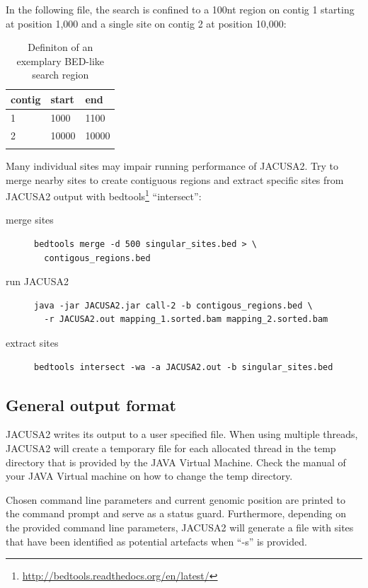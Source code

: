 \documentclass[10pt,a4paper]{article} \usepackage[utf8]{inputenc}
\begin{document}
In the following file, the search is confined to a 100nt region on contig 1
starting at position 1,000 and a single site on contig 2 at position 10,000:
\begin{table}
\centering
  \caption{Definiton of an exemplary BED-like search region}
  \label{tbl:search_region}
  \begin{tabular}{lll}
    \textbf{contig} & \textbf{start} & \textbf{end} \\
    \hline
    1 & 1000 & 1100 \\
    2 & 10000 & 10000 \\
    \multicolumn{3}{c}{}
  \end{tabular}
\end{table}
Many individual sites may impair running performance of JACUSA2.
Try to merge nearby sites to create contiguous regions and extract specific sites from 
JACUSA2 output with bedtools\footnote{\url{http://bedtools.readthedocs.org/en/latest/}} ``intersect'':
\begin{description}
\item[merge sites] \begin{verbatim} 
bedtools merge -d 500 singular_sites.bed > \
  contigous_regions.bed
\end{verbatim}
\item[run JACUSA2] \begin{verbatim} 
java -jar JACUSA2.jar call-2 -b contigous_regions.bed \ 
  -r JACUSA2.out mapping_1.sorted.bam mapping_2.sorted.bam
\end{verbatim}
\item[extract sites] \begin{verbatim}
bedtools intersect -wa -a JACUSA2.out -b singular_sites.bed
\end{verbatim}
\end{description}
\subsection{General output format}
JACUSA2 writes its output to a user specified file. When using multiple threads, JACUSA2 will
create a temporary file for each allocated thread in the temp directory that is provided by the 
JAVA Virtual Machine. Check the manual of your JAVA Virtual machine on how to change the temp directory. 

Chosen command line parameters and current genomic position are printed to the command prompt and
serve as a status guard. Furthermore, depending on the provided command line parameters, JACUSA2
will generate a file with sites that have been identified as potential artefacts when ``-s'' is
provided.
\end{document}
